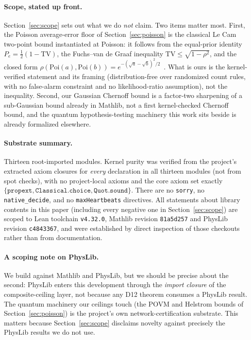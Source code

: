 \documentclass[aps,prx,reprint,nofootinbib,superscriptaddress]{revtex4-2}
\begin{document}
\paragraph{Scope, stated up front.} Section~\ref{sec:scope} sets out what we do \emph{not} claim.
Two items matter most. First, the Poisson average-error floor of
Section~\ref{sec:poisson} is the classical Le Cam two-point bound instantiated at Poisson: it
follows from the equal-prior identity $P_e = \tfrac{1}{2}(1 - \mathrm{TV})$, the Fuchs--van de
Graaf inequality $\mathrm{TV} \le \sqrt{1-\rho^2}$, and the closed form
$\rho(\mathrm{Poi}(a),\mathrm{Poi}(b)) = e^{-(\sqrt{a}-\sqrt{b})^2/2}$~\cite{FuchsvandeGraaf1999}.
What is ours is the kernel-verified statement and its framing (distribution-free over randomized count rules, with no false-alarm constraint and no likelihood-ratio assumption), not the inequality. Second, our Gaussian Chernoff bound is a factor-two sharpening of a sub-Gaussian bound
already in Mathlib, not a first kernel-checked Chernoff bound, and the quantum hypothesis-testing
machinery this work sits beside is already formalized elsewhere.

\paragraph{Substrate summary.} Thirteen root-imported modules. Kernel purity was verified from the
project's extracted axiom closures for \emph{every} declaration in all thirteen modules (not from spot checks), with no project-local axioms and the core axiom set exactly
$\{\texttt{propext},\allowbreak \texttt{Classical.choice},\allowbreak \texttt{Quot.sound}\}$. There
are no \texttt{sorry}, no \texttt{native\_decide}, and no \texttt{maxHeartbeats} directives. All
statements about library contents in this paper (including every negative one in Section~\ref{sec:scope}) are scoped to Lean toolchain \texttt{v4.32.0}, Mathlib revision
\texttt{81a5d257} and PhysLib revision \texttt{c4843367}, and were established by direct inspection
of those checkouts rather than from documentation.

\paragraph{A scoping note on PhysLib.} We build against Mathlib and PhysLib, but we should be precise
about the second: PhysLib enters this development through the \emph{import closure} of the
composite-ceiling layer, not because any D12 theorem consumes a PhysLib result. The quantum
machinery our ceilings touch (the POVM and Helstrom bounds of Section~\ref{sec:poisson}) is the
project's own network-certification substrate. This matters because Section~\ref{sec:scope}
disclaims novelty against precisely the PhysLib results we do not use.
\end{document}
